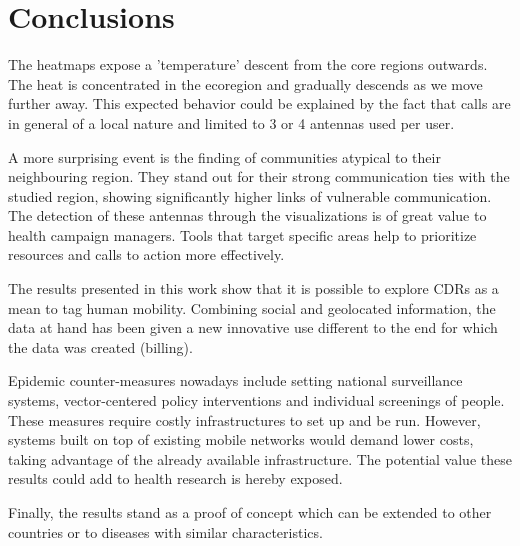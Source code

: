 \section{Conclusions}

The heatmaps expose a 'temperature' descent from the core regions outwards. The heat is concentrated in the ecoregion and gradually descends as we move further away. This expected behavior could be explained by the fact that calls are in general of a local nature and limited to 3 or 4 antennas used per user. 

A more surprising event is the finding of communities atypical to their neighbouring region. They stand out for their strong communication ties with the studied region, showing significantly higher links of vulnerable communication. The detection of these antennas through the visualizations is of great value to health campaign managers. Tools that target specific areas help to prioritize resources and calls to action more effectively.

The results presented in this work show that it is possible to explore CDRs as a mean to tag human mobility. Combining social and geolocated information, the data at hand has been given a new innovative use different to the end for which the data was created (billing).

Epidemic counter-measures nowadays include setting national surveillance systems, vector-centered policy interventions and individual screenings of people. These measures require costly infrastructures to set up and be run. However, systems built on top of existing mobile networks would demand lower costs, taking advantage of the already available infrastructure. The potential value these results could add to health research is hereby exposed.

Finally, the results stand as a proof of concept which can be extended to other countries or to diseases with similar characteristics.


